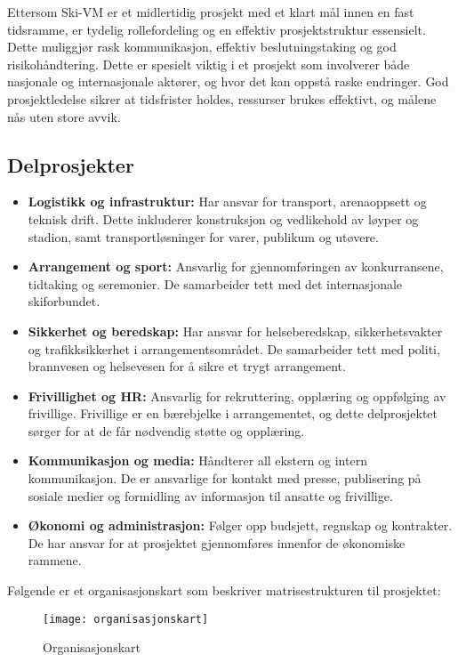 Ettersom Ski-VM er et midlertidig prosjekt med et klart mål innen en fast tidsramme, er tydelig rollefordeling og en effektiv prosjektstruktur essensielt. Dette muliggjør rask kommunikasjon, effektiv beslutningstaking og god risikohåndtering. Dette er spesielt viktig i et prosjekt som involverer både nasjonale og internasjonale aktører, og hvor det kan oppstå raske endringer. God prosjektledelse sikrer at tidsfrister holdes, ressurser brukes effektivt, og målene nås uten store avvik.

\subsection*{Delprosjekter}

\begin{itemize}
    \item \textbf{Logistikk og infrastruktur:} Har ansvar for transport, arenaoppsett og teknisk drift. Dette inkluderer konstruksjon og vedlikehold av løyper og stadion, samt transportløsninger for varer, publikum og utøvere.
    
    \item \textbf{Arrangement og sport:} Ansvarlig for gjennomføringen av konkurransene, tidtaking og seremonier. De samarbeider tett med det internasjonale skiforbundet.
    
    \item \textbf{Sikkerhet og beredskap:} Har ansvar for helseberedskap, sikkerhetsvakter og trafikksikkerhet i arrangementsområdet. De samarbeider tett med politi, brannvesen og helsevesen for å sikre et trygt arrangement.
    
    \item \textbf{Frivillighet og HR:} Ansvarlig for rekruttering, opplæring og oppfølging av frivillige. Frivillige er en bærebjelke i arrangementet, og dette delprosjektet sørger for at de får nødvendig støtte og opplæring.
    
    \item \textbf{Kommunikasjon og media:} Håndterer all ekstern og intern kommunikasjon. De er ansvarlige for kontakt med presse, publisering på sosiale medier og formidling av informasjon til ansatte og frivillige.
    
    \item \textbf{Økonomi og administrasjon:} Følger opp budsjett, regnskap og kontrakter. De har ansvar for at prosjektet gjennomføres innenfor de økonomiske rammene.
\end{itemize}
Følgende er et organisasjonskart som beskriver matrisestrukturen til prosjektet:
\begin{figure}[h]
    \centering
    \texttt{[image: organisasjonskart]}
    \caption{Organisasjonskart}
    \label{fig:organisasjonskart}
\end{figure}